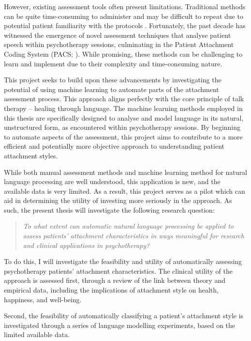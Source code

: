 \documentclass[12pt]{report}
\begin{document}
However, existing assessment tools often present limitations.
Traditional methods can be quite time-consuming to administer and may be difficult to repeat due to potential patient familiarity with the protocols \cite{Daniel2015}.
Fortunately, the past decade has witnessed the emergence of novel assessment techniques that analyse patient speech within psychotherapy sessions, culminating in the Patient Attachment Coding System (PACS; ).
While promising, these methods can be challenging to learn and implement due to their complexity and time-consuming nature.

This project seeks to build upon these advancements by investigating the potential of using machine learning to automate parts of the attachment assessment process.
This approach aligns perfectly with the core principle of talk therapy -- healing through language.
The machine learning methods employed in this thesis are specifically designed to analyse and model language in its natural, unstructured form, as encountered within psychotherapy sessions.
By beginning to automate aspects of the assessment, this project aims to contribute to a more efficient and potentially more objective approach to understanding patient attachment styles.

While both manual assessment methods and machine learning method for natural language processing are well understood, this application is new, and the available data is very limited.
As a result, this project serves as a pilot which can aid in determining the utility of investing more seriously in the approach.
As such, the present thesis will investigate the following research question:
\begin{quote}
    \textit{To what extent can automatic natural language processing be applied to assess patients' attachment characteristics in ways meaningful for research and clinical applications in psychotherapy?}
\end{quote}
To do this, I will investigate the feasibility and utility of automatically assessing psychotherapy patients' attachment characteristics.
The clinical utility of the approach is assessed first, through a review of the link between theory and empirical data, including the implications of attachment style on health, happiness, and well-being.

Second, the feasibility of automatically classifying a patient's attachment style is investigated through a series of language modelling experiments, based on the limited available data.
\end{document}
